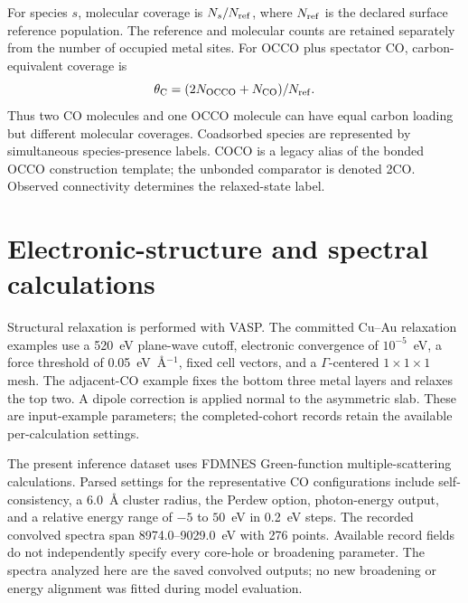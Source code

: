 \documentclass[11pt,a4paper]{article}
\begin{document}
For species $s$, molecular coverage is $N_s/N_{\rm ref}$, where $N_{\rm ref}$ is the declared surface reference population. The reference and molecular counts are retained separately from the number of occupied metal sites. For OCCO plus spectator CO, carbon-equivalent coverage is
\begin{equation}
\theta_{\rm C}=(2N_{\rm OCCO}+N_{\rm CO})/N_{\rm ref}.
\end{equation}
Thus two CO molecules and one OCCO molecule can have equal carbon loading but different molecular coverages. Coadsorbed species are represented by simultaneous species-presence labels. COCO is a legacy alias of the bonded OCCO construction template; the unbonded comparator is denoted 2CO. Observed connectivity determines the relaxed-state label.

\section{Electronic-structure and spectral calculations}
Structural relaxation is performed with VASP.\cite{vasp1996} The committed Cu--Au relaxation examples use a 520~eV plane-wave cutoff, electronic convergence of $10^{-5}$~eV, a force threshold of 0.05~eV~\AA$^{-1}$, fixed cell vectors, and a $\Gamma$-centered $1\times1\times1$ mesh. The adjacent-CO example fixes the bottom three metal layers and relaxes the top two. A dipole correction is applied normal to the asymmetric slab. These are input-example parameters; the completed-cohort records retain the available per-calculation settings.

The present inference dataset uses FDMNES Green-function multiple-scattering calculations.\cite{joly2001} Parsed settings for the representative CO configurations include self-consistency, a 6.0~\AA{} cluster radius, the Perdew option, photon-energy output, and a relative energy range of $-5$ to $50$~eV in 0.2~eV steps. The recorded convolved spectra span 8974.0--9029.0~eV with 276 points. Available record fields do not independently specify every core-hole or broadening parameter. The spectra analyzed here are the saved convolved outputs; no new broadening or energy alignment was fitted during model evaluation.
\end{document}
